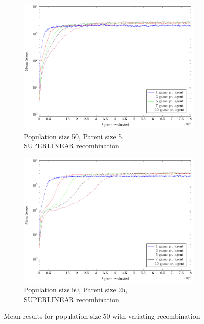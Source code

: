 \begin{figure}
\begin{subfigure}[b]{0.49\textwidth}
    \end{subfigure}
    \begin{subfigure}[b]{0.49\textwidth}
    	\centering
    	\caption{Population size 50, Parent size 5,\\SUPERLINEAR recombination}
        \includegraphics[width=\textwidth]{data/cma_population_offspring/50x_split/superlinear_l50_o5/mean/PlotFile.pdf}
    \end{subfigure}
    \begin{subfigure}[b]{0.49\textwidth}
    	\centering
    	\caption{Population size 50, Parent size 25,\\SUPERLINEAR recombination}
        \includegraphics[width=\textwidth]{data/cma_population_offspring/50x_split/superlinear_l50_o25/mean/PlotFile.pdf}
    \end{subfigure}
    
    \caption{Mean results for population size 50 with variating recombination}
\end{figure}

